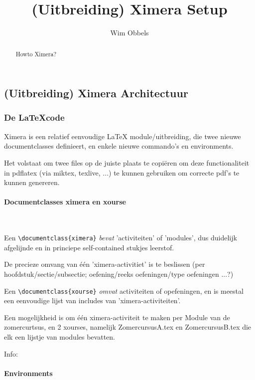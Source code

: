 \documentclass{ximera}
\author{Wim Obbels}
\title{(Uitbreiding) Ximera Setup}
\begin{document}
\begin{abstract}
	Howto Ximera?
\end{abstract}
\maketitle


\subsection{(Uitbreiding) Ximera Architectuur}

\subsubsection{De \LaTeX code}

Ximera is een relatief eenvoudige LaTeX module/uitbreiding, die twee nieuwe documentclasses definieert, en enkele nieuwe commando's en environments.

Het volstaat om twee files op de juiste plaats te copiëren om deze functionaliteit in pdflatex (via miktex, texlive, ...)  te kunnen gebruiken om correcte pdf's te kunnen genereren.


\paragraph{Documentclasses ximera en xourse} \ 

Een \verb|\documentclass{ximera}| \textit{bevat} 'activiteiten' of 'modules', dus duidelijk afgelijnde en in princiepe self-contained stukjes leerstof. 

De precieze omvang van één 'ximera-activitiet' is te beslissen (per hoofdstuk/sectie/subsectie; oefening/reeks oefeningen/type oefeningen ...?)

Een \verb|\documentclass{xourse}| \textit{omvat}  activiteiten of opefeningen, en is meestal een eenvoudige lijst van includes van 'ximera-activiteiten'. 

Een mogelijkheid is om één ximera-activiteit te maken per Module van de zomercurtsus, en 2 xourses, namelijk ZomercursusA.tex en ZomercursusB.tex die elk een lijstje van modules bevatten.


Info: 

\paragraph{Environments} \ 
\end{document}
